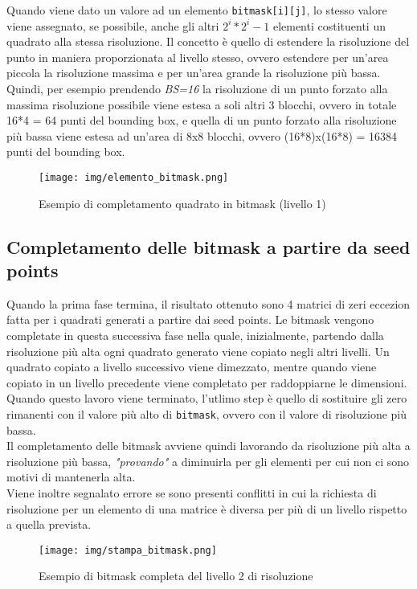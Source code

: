 			Quando viene dato un valore ad un elemento \texttt{bitmask[i][j]}, lo stesso valore viene assegnato, se possibile, anche gli altri $2^i * 2^i - 1$ elementi costituenti un quadrato alla stessa risoluzione. Il concetto \`{e} quello di estendere la risoluzione del punto in maniera proporzionata al livello stesso, ovvero estendere per un'area piccola la risoluzione massima e per un'area grande la risoluzione pi\`{u} bassa. Quindi, per esempio prendendo \textit{BS=16} la risoluzione di un punto forzato alla massima risoluzione possibile viene estesa a soli altri 3 blocchi, ovvero in totale 16*4 = 64 punti del bounding box, e quella di un punto forzato alla risoluzione pi\`{u} bassa viene estesa ad un'area di 8x8 blocchi, ovvero (16*8)x(16*8) = 16384 punti del bounding box.  
			\begin{figure}[htbp]
				\centering
				\texttt{[image: img/elemento\_bitmask.png]}
				\caption{Esempio di completamento quadrato in bitmask (livello 1)}
			\end{figure}
		\subsection{Completamento delle bitmask a partire da seed points}

			Quando la prima fase termina, il risultato ottenuto sono 4 matrici di zeri eccezion fatta per i quadrati generati a partire dai seed points. Le bitmask vengono completate in questa successiva fase nella quale, inizialmente, partendo dalla risoluzione pi\`{u} alta ogni quadrato generato viene copiato negli altri livelli. Un quadrato copiato a livello successivo viene dimezzato, mentre quando viene copiato in un livello precedente viene completato per raddoppiarne le dimensioni.\\
			Quando questo lavoro viene terminato, l'utlimo step \`{e} quello di sostituire gli zero rimanenti con il valore pi\`{u} alto di \texttt{bitmask}, ovvero con il valore di risoluzione pi\`{u} bassa. \\
			Il completamento delle bitmask avviene quindi lavorando da risoluzione pi\`{u} alta a risoluzione pi\`{u} bassa, \textit{"provando"} a diminuirla per gli elementi per cui non ci sono motivi di mantenerla alta. \\
			Viene inoltre segnalato errore se sono presenti conflitti in cui la richiesta di risoluzione per un elemento di una matrice \`{e} diversa per pi\`{u} di un livello rispetto a quella prevista. 
			\begin{figure}[htbp]
				\centering
				\texttt{[image: img/stampa\_bitmask.png]}
				\caption{Esempio di bitmask completa del livello 2 di risoluzione}
			\end{figure} 

